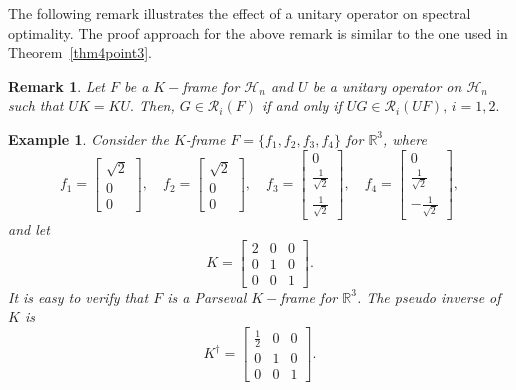 \documentclass[final,1p,times]{elsarticle}
\newtheorem{rem}[thm]{Remark}
\newtheorem{example}[thm]{Example}
\begin{document}
	\noindent The following remark illustrates the effect of a unitary operator on spectral optimality. The proof approach for the above remark is similar to the one used in Theorem~\ref{thm4point3}.

	
	\begin{rem}\label{prop3point15}
		Let $F$ be a $K-$frame for $\mathcal{H}_n$  and  $U$ be a unitary operator on $\mathcal{H}_n$ such that $UK = KU.$ Then, $G \in \mathcal{R}_{i}(F)$ if and only if $UG \in \mathcal{R}_{i}(UF),\, i=1,2.$
	\end{rem}
	
	

	\noindent
\begin{example}
Consider the $K$-frame $F = \{f_1, f_2, f_3, f_4\}$ for $\mathbb{R}^3$, where
\[
f_1 = \begin{bmatrix} \sqrt{2} \\ 0 \\ 0 \end{bmatrix}, \quad
f_2 = \begin{bmatrix} \sqrt{2} \\ 0 \\ 0 \end{bmatrix}, \quad
f_3 = \begin{bmatrix} 0 \\ \frac{1}{\sqrt{2}} \\ \frac{1}{\sqrt{2}} \end{bmatrix}, \quad
f_4 = \begin{bmatrix} 0 \\ \frac{1}{\sqrt{2}} \\ -\frac{1}{\sqrt{2}} \end{bmatrix},
\]
and let
\[
K = \begin{bmatrix}
2 & 0 & 0 \\
0 & 1 & 0 \\
0 & 0 & 1
\end{bmatrix}.
\]
It is easy to verify that $F$ is a Parseval $K-$frame for $\mathbb{R}^3$. The pseudo inverse of $K$ is
\[
K^\dag = \begin{bmatrix}
\frac{1}{2} & 0 & 0 \\
0 & 1 & 0 \\
0 & 0 & 1
\end{bmatrix}.
\]


\end{example}
\end{document}
